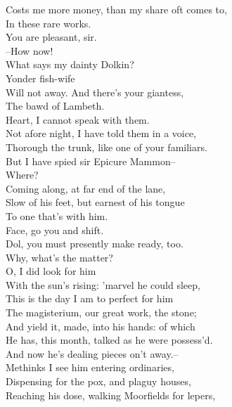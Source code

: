 \documentclass{memoir}
\begin{document}
\begin{drama*}
 Costs me more money, than my share oft comes to,\\
 In these rare works.\\
\subtlespeaks {} You are pleasant, sir.\\
 --How now!\\
 What says my dainty Dolkin?\\
\dolspeaks {} Yonder fish-wife\\
 Will not away. And there's your giantess,\\
 The bawd of Lambeth.\\
\subtlespeaks {} Heart, I cannot speak with them.\\
\dolspeaks  Not afore night, I have told them in a voice,\\
 Thorough the trunk, like one of your familiars.\\
 But I have spied sir Epicure Mammon--\\
\subtlespeaks  Where?\\
\dolspeaks {} Coming along, at far end of the lane,\\
 Slow of his feet, but earnest of his tongue\\
 To one that's with him.\\
\subtlespeaks {} Face, go you and shift.\\
 Dol, you must presently make ready, too.\\
\dolspeaks  Why, what's the matter?\\
\subtlespeaks {} O, I did look for him\\
 With the sun's rising: 'marvel he could sleep,\\
 This is the day I am to perfect for him\\
 The magisterium, our great work, the stone;\\
 And yield it, made, into his hands: of which\\
 He has, this month, talked as he were possess'd.\\
 And now he's dealing pieces on't away.--\\
 Methinks I see him entering ordinaries,\\
 Dispensing for the pox, and plaguy houses,\\
 Reaching his dose, walking Moorfields for lepers,\\

\end{drama*}
\end{document}
